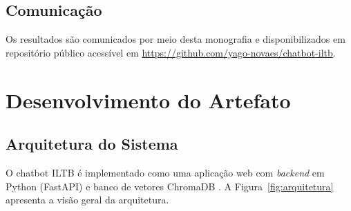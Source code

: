 \documentclass[
  12pt,
  oneside,
  a4paper,
  english,
  brazil
]{abntex2}
\begin{document}
\section{Comunicação}

Os resultados são comunicados por meio desta monografia e disponibilizados em
repositório público acessível em \url{https://github.com/yago-novaes/chatbot-iltb}.

\chapter{Desenvolvimento do Artefato}
\label{cap:desenvolvimento}

\section{Arquitetura do Sistema}

O chatbot ILTB é implementado como uma aplicação web com \textit{backend} em
Python (FastAPI) e banco de vetores ChromaDB \cite{chroma2024}. A
Figura~\ref{fig:arquitetura} apresenta a visão geral da arquitetura.
\end{document}
